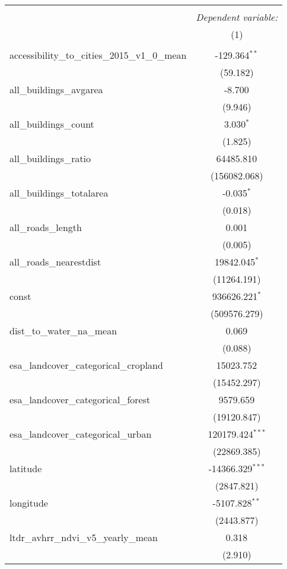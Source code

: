 \begin{table}[!htbp] \centering
\begin{tabular}{@{\extracolsep{5pt}}lc}
\\[-1.8ex]\hline
\hline \\[-1.8ex]
& \multicolumn{1}{c}{\textit{Dependent variable:}} \
\cr \cline{1-2}
\\[-1.8ex] & (1) \\
\hline \\[-1.8ex]
 accessibility_to_cities_2015_v1_0_mean & -129.364$^{**}$ \\
  & (59.182) \\
 all_buildings_avgarea & -8.700$^{}$ \\
  & (9.946) \\
 all_buildings_count & 3.030$^{*}$ \\
  & (1.825) \\
 all_buildings_ratio & 64485.810$^{}$ \\
  & (156082.068) \\
 all_buildings_totalarea & -0.035$^{*}$ \\
  & (0.018) \\
 all_roads_length & 0.001$^{}$ \\
  & (0.005) \\
 all_roads_nearestdist & 19842.045$^{*}$ \\
  & (11264.191) \\
 const & 936626.221$^{*}$ \\
  & (509576.279) \\
 dist_to_water_na_mean & 0.069$^{}$ \\
  & (0.088) \\
 esa_landcover_categorical_cropland & 15023.752$^{}$ \\
  & (15452.297) \\
 esa_landcover_categorical_forest & 9579.659$^{}$ \\
  & (19120.847) \\
 esa_landcover_categorical_urban & 120179.424$^{***}$ \\
  & (22869.385) \\
 latitude & -14366.329$^{***}$ \\
  & (2847.821) \\
 longitude & -5107.828$^{**}$ \\
  & (2443.877) \\
 ltdr_avhrr_ndvi_v5_yearly_mean & 0.318$^{}$ \\
  & (2.910) \\

\end{tabular}
\end{table}
